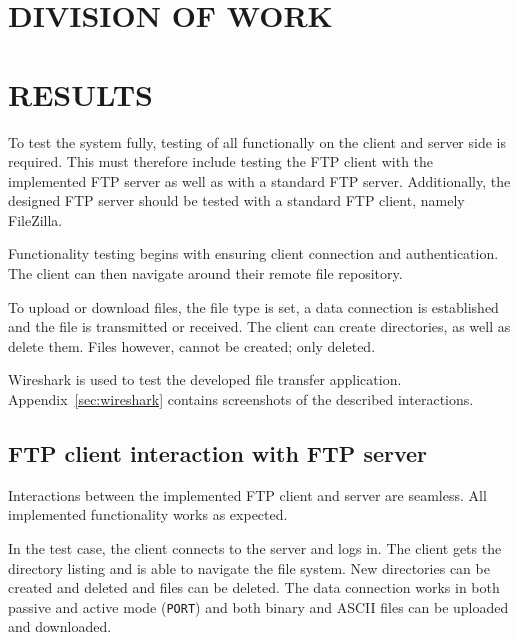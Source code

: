 \documentclass[10pt,twocolumn]{witseiepaper}
\begin{document}



\section{DIVISION OF WORK}

\section{RESULTS}\label{results}

To test the system fully, testing of all functionally on the client and server side is required. This must therefore include testing the FTP client with the implemented FTP server as well as with a standard FTP server. Additionally, the designed FTP server should be tested with a standard FTP client, namely FileZilla. 

Functionality testing begins with ensuring client connection and authentication. The client can then navigate around their remote file repository. 

To upload or download files, the file type is set, a data connection is established and the file is transmitted or received. The client can create directories, as well as delete them. Files however, cannot be created;  only deleted.

Wireshark is used to test the developed file transfer application.
Appendix~\ref{sec:wireshark} contains screenshots of the described interactions. 

\subsection{FTP client interaction with FTP server}

Interactions between the implemented FTP client and server are seamless. All implemented functionality works as expected.

In the test case, the client connects to the server and logs in. The client gets the directory listing and is able to navigate the file system. New directories can be created and deleted and files can be deleted. The data connection works in both passive and active mode (\texttt{PORT}) and both binary and ASCII files can be uploaded and downloaded.
 
\end{document}
